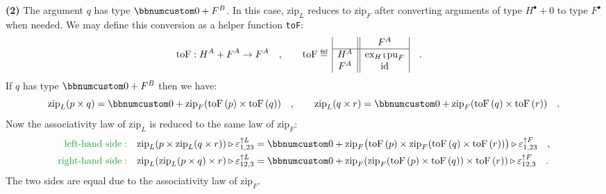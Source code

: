 \textbf{(2)} The argument $q$ has type $\bbnum 0+F^{B}$. In this
case, $\text{zip}_{L}$ reduces to $\text{zip}_{F}$ after converting
arguments of type $H^{\bullet}+0$ to type $F^{\bullet}$ when needed.
We may define this conversion as a helper function \lstinline!toF!:
\begin{align*}
 & \text{toF}:H^{A}+F^{A}\rightarrow F^{A}\quad,\quad\quad\text{toF}\triangleq\,\begin{array}{|c||c|}
 & F^{A}\\
\hline H^{A} & \text{ex}_{H}\bef\text{pu}_{F}\\
F^{A} & \text{id}
\end{array}\quad.
\end{align*}
If $q$ has type $\bbnum 0+F^{B}$ then we have:
\[
\text{zip}_{L}(p\times q)=\bbnum 0+\text{zip}_{F}(\text{toF}\left(p\right)\times\text{toF}\left(q\right))\quad,\quad\quad\text{zip}_{L}(q\times r)=\bbnum 0+\text{zip}_{F}(\text{toF}\left(q\right)\times\text{toF}\left(r\right))\quad.
\]
Now the associativity law of $\text{zip}_{L}$ is reduced to the same
law of $\text{zip}_{F}$:
\begin{align*}
{\color{greenunder}\text{left-hand side}:}\quad & \text{zip}_{L}(p\times\text{zip}_{L}(q\times r))\triangleright\varepsilon_{1,23}^{\uparrow L}=\bbnum 0+\text{zip}_{F}\big(\text{toF}\left(p\right)\times\text{zip}_{F}(\text{toF}\left(q\right)\times\text{toF}\left(r\right))\big)\triangleright\varepsilon_{1,23}^{\uparrow F}\quad,\\
{\color{greenunder}\text{right-hand side}:}\quad & \text{zip}_{L}(\text{zip}_{L}(p\times q)\times r)\triangleright\varepsilon_{12,3}^{\uparrow L}=\bbnum 0+\text{zip}_{F}(\text{zip}_{F}(\text{toF}\left(p\right)\times\text{toF}\left(q\right))\times\text{toF}\left(r\right))\triangleright\varepsilon_{12,3}^{\uparrow F}\quad.
\end{align*}
The two sides are equal due to the associativity law of $\text{zip}_{F}$.

